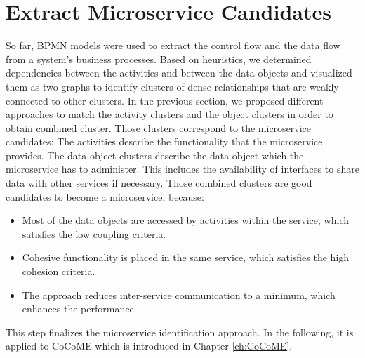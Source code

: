 \section{Extract Microservice Candidates}
\label{sec:Solution:ExtractMicroserviceCandidates}
So far, BPMN models were used to extract the control flow and the data flow from a system's business processes. Based on heuristics, we determined dependencies between the activities and between the data objects and visualized them as two graphs to identify clusters of dense relationships that are weakly connected to other clusters. In the previous section, we proposed different approaches to match the activity clusters and the object clusters in order to obtain combined cluster. Those clusters correspond to the microservice candidates: The activities describe the functionality that the microservice provides. The data object clusters describe the data object which the microservice has to administer. This includes the availability of interfaces to share data with other services if necessary.
Those combined clusters are good candidates to become a microservice, because:
\begin{itemize}
	\item Most of the data objects are accessed by activities within the service, which satisfies the low coupling criteria.
	\item Cohesive functionality is placed in the same service, which satisfies the high cohesion criteria.
	\item The approach reduces inter-service communication to a minimum, which enhances the performance.
\end{itemize}

This step finalizes the microservice identification approach. In the following, it is applied to CoCoME which is introduced in Chapter \ref{ch:CoCoME}. 










